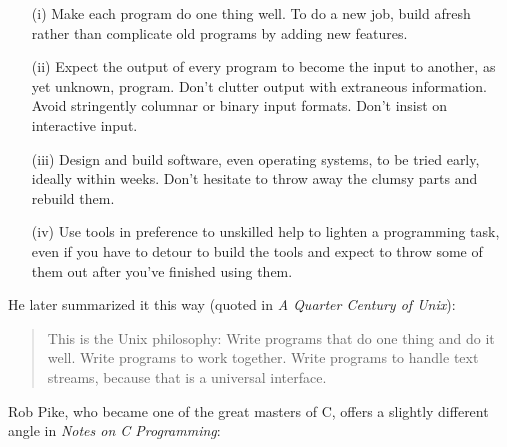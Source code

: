 \documentclass[10pt,twoside,openright]{memoir}
\begin{document}
\begin{itemize}

\item[(i)] Make each program do one thing well. To do a new job, build afresh rather than complicate old programs by adding new features.

\item[(ii)] Expect the output of every program to become the input to another, as yet unknown, program. Don't clutter output with extraneous information. Avoid stringently columnar or binary input formats. Don't insist on interactive input.

\item[(iii)] Design and build software, even operating systems, to be tried early, ideally within weeks. Don't hesitate to throw away the clumsy parts and rebuild them.

\item[(iv)] Use tools in preference to unskilled help to lighten a programming task, even if you have to detour to build the tools and expect to throw some of them out after you've finished using them.

\end{itemize}

He later summarized it this way (quoted in \emph{A Quarter Century of Unix}):

\begin{quote}
This is the Unix philosophy: Write programs that do one thing and do it well. Write programs to work together. Write programs to handle text streams, because that is a universal interface.
\end{quote}

Rob Pike, who became one of the great masters of C, offers a slightly different angle in \emph{Notes on C Programming}:
\end{document}
